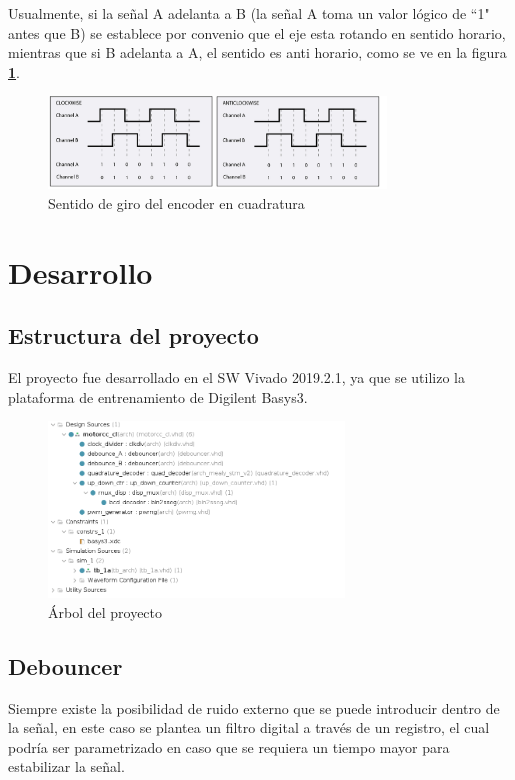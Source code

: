 \documentclass[11pt, a4paper]{article}
\begin{document}
Usualmente, si la señal A adelanta a B (la señal A toma un valor lógico de ``1" antes que B) se establece por convenio que el eje esta rotando en sentido horario, mientras que si B adelanta a A, el sentido es anti horario, como se ve en la figura \textcolor{blue}{\textbf{\ref{fig:encoder_cuadratura}}}.
\begin{figure}[h]
	\centering
	\includegraphics[width=0.8\textwidth]{Imagenes/encoder_cuadratura.jpg}
	\caption{Sentido de giro del encoder en cuadratura}
	\label{fig:encoder_cuadratura}
\end{figure} 

\clearpage
\section{Desarrollo}

	\subsection{Estructura del proyecto}
	El proyecto fue desarrollado en el SW Vivado 2019.2.1, ya que se utilizo la plataforma de entrenamiento de Digilent Basys3.

	\begin{figure}[H]
		\centering
		\includegraphics[width=0.7\textwidth]{Imagenes/estructura.png}
		\caption{Árbol del proyecto}
		\label{fig:proyecto_vivado}
	\end{figure} 

	\subsection{Debouncer}
	Siempre existe la posibilidad de ruido externo que se puede introducir dentro de la señal, en este caso se plantea un filtro digital a través de un registro, el cual podría ser parametrizado en caso que se requiera un tiempo mayor para estabilizar la señal.
\end{document}
